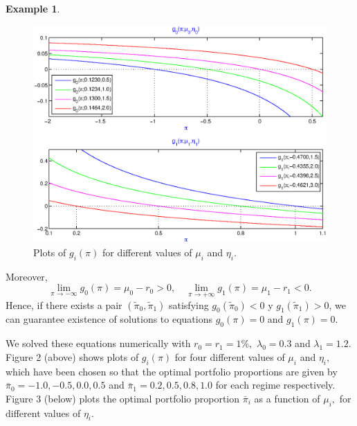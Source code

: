 \documentclass[11pt]{article}
\theoremstyle{plain}
\theoremstyle{definition}
\newtheorem{example}[theorem]{Example}
\numberwithin{equation}{section}
\begin{document}
\begin{example}
\begin{figure}[hb]
\centering
\includegraphics[scale=0.75]{Figure22.eps}
\caption{\small Plots of $g_i(\pi)$ for  different values of $\mu_i$ and $\eta_i$.}
\end{figure}
Moreover,
\begin{equation*}
\lim_{\pi\to -\infty}g_0(\pi)=\mu_0-r_0>0, \quad \lim_{\pi\to +\infty}g_1(\pi)=\mu_1-r_1<0.
\end{equation*}
Hence, if there exists a pair $(\tilde\pi_0,\tilde\pi_1)$ satisfying $g_0(\tilde\pi_0)<0$ y $g_1(\tilde\pi_1)>0$, we can guarantee existence of solutions to equations $g_0(\pi)=0$ and $g_1(\pi)=0.$

We solved these equations numerically with $r_0=r_1=1\%,$ $\lambda_0=0.3$ and $\lambda_1=1.2.$ Figure 2 (above) shows plots of $g_i(\pi)$ for four different values of $\mu_i$ and $\eta_i,$ which have been chosen so that the optimal portfolio proportions are given by $\bar\pi_0=-1.0, -0.5, 0.0, 0.5$ and $\bar\pi_1=0.2, 0.5, 0.8, 1.0$ for each regime respectively. Figure 3 (below) plots the optimal portfolio proportion $\bar\pi_i$ as a function of $\mu_i,$ for different values of $\eta_i.$


\end{example}
\end{document}
